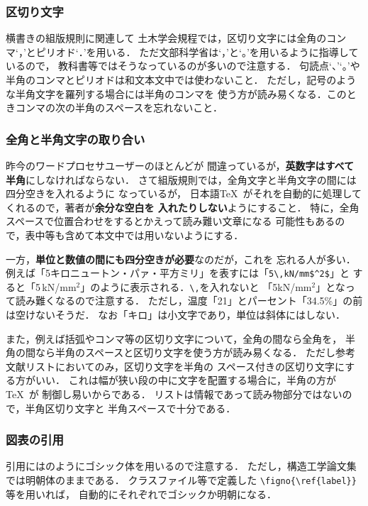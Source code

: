 \documentclass[onecolumn]{jsce}  %
\begin{document}
\subsubsection{区切り文字}

横書きの組版規則に関連して
土木学会規程では，区切り文字には全角のコンマ`，'とピリオド`．'を用いる．
ただ文部科学省は`，'と`。'を用いるように指導しているので，
教科書等ではそうなっているのが多いので注意する．
句読点`、'`。'や半角のコンマとピリオドは和文本文中では使わないこと．
ただし，記号のような半角文字を羅列する場合には半角のコンマを
使う方が読み易くなる．このときコンマの次の半角のスペースを忘れないこと．

\subsubsection{全角と半角文字の取り合い}

昨今のワードプロセサユーザーのほとんどが
間違っているが，{\bf 英数字はすべて半角}にしなければならない．
さて組版規則では，全角文字と半角文字の間には四分空きを入れるように
なっているが，
日本語\TeX\ がそれを自動的に処理してくれるので，著者が{\bf 余分な空白を
入れたりしない}ようにすること．
特に，全角スペースで位置合わせをするとかえって読み難い文章になる
可能性もあるので，表中等も含めて本文中では用いないようにする．

一方，{\bf 単位と数値の間にも四分空きが必要}なのだが，これを
忘れる人が多い．
例えば「5キロニュートン・パァ・平方ミリ」を表すには「\verb+5\,kN/mm$^2$+」と
すると「5\,kN/mm$^2$」のように表示される．\verb+\,+を入れないと
「5kN/mm$^2$」となって読み難くなるので注意する．
ただし，温度「21\degC」とパーセント「34.5\%」の前は空けないそうだ．
なお「キロ」は小文字であり，単位は斜体にはしない．

また，例えば括弧やコンマ等の区切り文字について，全角の間なら全角を，
半角の間なら半角のスペースと区切り文字を使う方が読み易くなる．
ただし参考文献リストにおいてのみ，区切り文字を半角の
スペース付きの区切り文字にする方がいい．
これは幅が狭い段の中に文字を配置する場合に，半角の方が\TeX\ が
制御し易いからである．
リストは情報であって読み物部分ではないので，半角区切り文字と
半角スペースで十分である．

\subsubsection{図表の引用}

引用には\figno{\ref{fig:layout}}のようにゴシック体を用いるので注意する．
ただし，構造工学論文集では明朝体のままである．
クラスファイル等で定義した \verb+\figno{\ref{label}}+等を用いれば，
自動的にそれぞれでゴシックか明朝になる．
\end{document}
